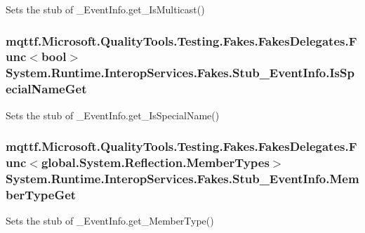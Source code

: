 Sets the stub of \-\_\-\-Event\-Info.\-get\-\_\-\-Is\-Multicast()

\hypertarget{class_system_1_1_runtime_1_1_interop_services_1_1_fakes_1_1_stub___event_info_a46f7656ffaa65f0748c8529da54fc67e}{
\subsubsection[{Is\-Special\-Name\-Get}]{\setlength{\rightskip}{0pt plus 5cm}mqttf.\-Microsoft.\-Quality\-Tools.\-Testing.\-Fakes.\-Fakes\-Delegates.\-Func$<$bool$>$ System.\-Runtime.\-Interop\-Services.\-Fakes.\-Stub\-\_\-\-Event\-Info.\-Is\-Special\-Name\-Get}}\label{class_system_1_1_runtime_1_1_interop_services_1_1_fakes_1_1_stub___event_info_a46f7656ffaa65f0748c8529da54fc67e}


Sets the stub of \-\_\-\-Event\-Info.\-get\-\_\-\-Is\-Special\-Name()

\hypertarget{class_system_1_1_runtime_1_1_interop_services_1_1_fakes_1_1_stub___event_info_abfa8ce87977351195aac3a654f6708d6}{
\subsubsection[{Member\-Type\-Get}]{\setlength{\rightskip}{0pt plus 5cm}mqttf.\-Microsoft.\-Quality\-Tools.\-Testing.\-Fakes.\-Fakes\-Delegates.\-Func$<$global.\-System.\-Reflection.\-Member\-Types$>$ System.\-Runtime.\-Interop\-Services.\-Fakes.\-Stub\-\_\-\-Event\-Info.\-Member\-Type\-Get}}\label{class_system_1_1_runtime_1_1_interop_services_1_1_fakes_1_1_stub___event_info_abfa8ce87977351195aac3a654f6708d6}


Sets the stub of \-\_\-\-Event\-Info.\-get\-\_\-\-Member\-Type()

